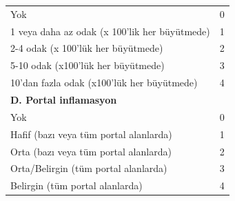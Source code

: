 \begin{minipage}[c]{\textwidth}
\begin{threeparttable}
{\begin{tabular}{ll}
\midrule
Yok                                                                                  & 0 \\
1 veya daha az odak (x 100’lik her büyütmede)                                        & 1 \\
2-4 odak (x 100’lük her büyütmede)                                                   & 2 \\
5-10 odak (x100’lük her büyütmede)                                                   & 3 \\
10’dan fazla odak (x100’lük her büyütmede)                                           & 4 \\
\midrule
\textbf{D. Portal inflamasyon}                                                       &   \\
\midrule
Yok                                                                                  & 0 \\
Hafif (bazı veya tüm portal alanlarda)                                               & 1 \\
Orta (bazı veya tüm portal alanlarda)                                                & 2 \\
Orta/Belirgin (tüm portal alanlarda)                                                 & 3 \\
Belirgin (tüm portal alanlarda)                                                      & 4 \\
\bottomrule
\end{tabular}}
\begin{tablenotes}
\end{tablenotes}
\end{threeparttable}
\end{minipage}



\bigskip

